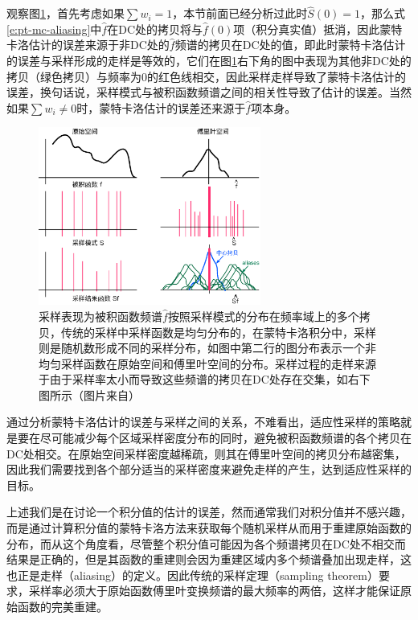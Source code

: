 观察图\ref{f:pt-sampling}，首先考虑如果$\sum w_i=1$，本节前面已经分析过此时$\hat{S}(0)=1$，那么式\ref{e:pt-mc-aliasing}中$\hat{f}$在DC处的拷贝将与$\hat{f}(0)$项（积分真实值）抵消，因此蒙特卡洛估计的误差来源于非DC处的$\hat{f}$频谱的拷贝在DC处的值，即此时蒙特卡洛估计的误差与采样形成的走样是等效的，它们在图\ref{f:pt-sampling}右下角的图中表现为其他非DC处的拷贝（绿色拷贝）与频率为0的红色线相交，因此采样走样导致了蒙特卡洛估计的误差，换句话说，采样模式与被积函数频谱之间的相关性导致了估计的误差。当然如果$\sum w_i\neq 0$时，蒙特卡洛估计的误差还来源于$\hat{f}$项本身。

\begin{figure}
	\sidecaption
	\includegraphics[width=0.65\textwidth]{figures/pt/sampling}
	\caption{采样表现为被积函数频谱$\hat{f}$按照采样模式的分布在频率域上的多个拷贝，传统的采样中采样函数是均匀分布的，在蒙特卡洛积分中，采样则是随机数形成不同的采样分布，如图中第二行的图分布表示一个非均匀采样函数在原始空间和傅里叶空间的分布。采样过程的走样来源于由于采样率太小而导致这些频谱的拷贝在DC处存在交集，如右下图所示（图片来自\cite{a:AFrequencyAnalysisofMonteCarloandotherNumericalIntegrationSchemes}）}
	\label{f:pt-sampling}
\end{figure}

通过分析蒙特卡洛估计的误差与采样之间的关系，不难看出，适应性采样的策略就是要在尽可能减少每个区域采样密度分布的同时，避免被积函数频谱的各个拷贝在DC处相交。在原始空间采样密度越稀疏，则其在傅里叶空间的拷贝分布越密集，因此我们需要找到各个部分适当的采样密度来避免走样的产生，达到适应性采样的目标。

上述我们是在讨论一个积分值的估计的误差，然而通常我们对积分值并不感兴趣，而是通过计算积分值的蒙特卡洛方法来获取每个随机采样从而用于重建原始函数的分布，而从这个角度看，尽管整个积分值可能因为各个频谱拷贝在DC处不相交而结果是正确的，但是其函数的重建则会因为重建区域内多个频谱叠加出现走样，这也正是走样（aliasing）的定义。因此传统的采样定理（sampling theorem）要求，采样率必须大于原始函数傅里叶变换频谱的最大频率的两倍，这样才能保证原始函数的完美重建。

